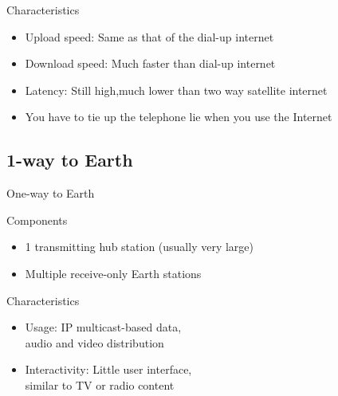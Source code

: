 \documentclass[pdf]{beamer}
\begin{document}
\begin{frame}{Characteristics}
  \begin{itemize}
    \item Upload speed: Same as that of the dial-up internet
    \item Download speed: Much faster than dial-up internet
    \item Latency: Still high,much lower than two way satellite internet
    \item You have to tie up the telephone lie when you use the Internet
  \end{itemize}
\end{frame}

\subsection{1-way to Earth}
\begin{frame}{One-way to Earth}\Large
  \begin{block}{Components}
    \begin{itemize}
      \item 1 transmitting hub station (usually very large)
      \item Multiple receive-only Earth stations
    \end{itemize}
  \end{block}
\end{frame}

\begin{frame}{Characteristics}\Large
  \begin{itemize}
    \item Usage: IP multicast-based data,\\
      audio and video distribution
    \item Interactivity: Little user interface,\\
      similar to TV or radio content
  \end{itemize}
\end{frame}
\end{document}
